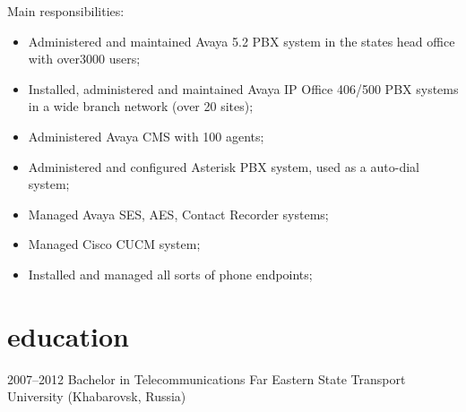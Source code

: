 \documentclass[]{cv-style}
\begin{document}
\begin{entrylist}
{  Main responsibilities:
  \begin{itemize}
      \item Administered and maintained Avaya 5.2 PBX system in the states head office with over3000 users;
      \item Installed, administered and maintained Avaya IP Office 406/500 PBX systems in a wide branch network (over 20 sites);
      \item Administered Avaya CMS with 100 agents;
      \item Administered and configured Asterisk PBX system, used as a auto-dial system;
      \item Managed Avaya SES, AES, Contact Recorder systems;
      \item Managed Cisco CUCM system;
      \item Installed and managed all sorts of phone endpoints;
  \end{itemize}}
\end{entrylist}

\section{education}

\begin{entrylist}
\entry
{2007--2012}
{Bachelor {\normalfont in Telecommunications}}
{Far Eastern State Transport University (Khabarovsk, Russia)}
{\vspace{-0.3cm}}
\end{entrylist}
\end{document}
